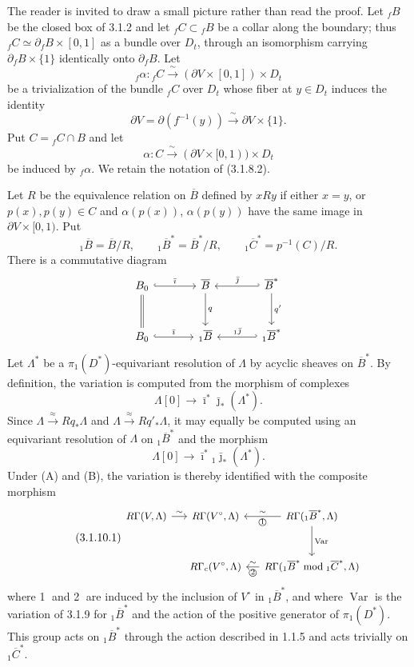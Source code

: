 The reader is invited to draw a small picture rather than read the
proof.  Let ${}_fB$ be the closed box of 3.1.2 and let
${}_fC\subset{}_fB$ be a collar along the boundary; thus
${}_fC\simeq\partial_fB\times[0,1]$ as a bundle over $D_t$, through
an isomorphism carrying $\partial_fB\times\{1\}$ identically onto
$\partial_fB$.  Let
\[
{}_f\alpha:{}_fC\xrightarrow{\ \sim\ }
(\partial V\times[0,1])\times D_t
\]
be a trivialization of the bundle ${}_fC$ over $D_t$ whose fiber at
$y\in D_t$ induces the identity
\[
\partial V=\partial(f^{-1}(y))
\xrightarrow{\ \sim\ }\partial V\times\{1\}.
\]
Put $C={}_fC\cap B$ and let
\[
\alpha:C\xrightarrow{\ \sim\ }
(\partial V\times[0,1))\times D_t
\]
be induced by ${}_f\alpha$.  We retain the notation of (3.1.8.2).

Let $R$ be the equivalence relation on $\overline B$ defined by
$xRy$ if either $x=y$, or $p(x),p(y)\in C$ and
$\alpha(p(x))$, $\alpha(p(y))$ have the same image in
$\partial V\times[0,1)$.  Put
\[
{}_1\overline B=\overline B/R,
\qquad
{}_1\overline B^*=\overline B^*/R,
\qquad
{}_1\overline C^*=p^{-1}(C)/R.
\]
There is a commutative diagram
\[
\begin{tikzcd}[column sep=large,row sep=large]
B_0 \arrow[r,hook,"\bar\imath"] \arrow[d,equal]
  & \overline B \arrow[d,"q"]
  & \overline B^* \arrow[l,hook',"\bar\jmath"'] \arrow[d,"q'"] \\
B_0 \arrow[r,hook,"\bar\imath"]
  & {}_1\overline B
  & {}_1\overline B^* \arrow[l,hook',"{}_1\bar\jmath"']
\end{tikzcd}
\]
Let $\Lambda^*$ be a $\pi_1(D^*)$-equivariant resolution of
$\Lambda$ by acyclic sheaves on $\overline B^*$.  By definition, the
variation is computed from the morphism of complexes
\[
\Lambda[0]\longrightarrow
\bar\imath^*\bar\jmath_*(\Lambda^*).
\]
Since $\Lambda\xrightarrow{\approx}Rq_*\Lambda$ and
$\Lambda\xrightarrow{\approx}Rq'_*\Lambda$, it may equally be computed
using an equivariant resolution of $\Lambda$ on
${}_1\overline B^*$ and the morphism
\[
\Lambda[0]\longrightarrow
\bar\imath^*{}_1\bar\jmath_*(\Lambda^*).
\]
Under (A) and (B), the variation is thereby identified with the
composite morphism
\begin{equation}\tag{3.1.10.1}
\begin{tikzcd}[column sep=small,row sep=large,cells={nodes={font=\small}}]
R\Gamma(V,\Lambda) \arrow[r,"\sim"]
  & R\Gamma(V^\circ,\Lambda)
  & R\Gamma({}_1\overline B^*,\Lambda)
      \arrow[l,"\sim"',"\text{\textcircled{1}}"]
      \arrow[d,"\operatorname{Var}"] \\
{}
  & R\Gamma_c(V^\circ,\Lambda)
  & R\Gamma({}_1\overline B^*\bmod{}_1\overline C^*,\Lambda)
      \arrow[l,"\sim"',"\text{\textcircled{2}}"]
\end{tikzcd}
\end{equation}
where \textcircled{1} and \textcircled{2} are induced by the inclusion
of $V^\circ$ in ${}_1\overline B^*$, and where
$\operatorname{Var}$ is the variation of 3.1.9 for
${}_1\overline B^*$ and the action of the positive generator of
$\pi_1(D^*)$.  This group acts on ${}_1\overline B^*$ through the
action described in 1.1.5 and acts trivially on
${}_1\overline C^*$.

